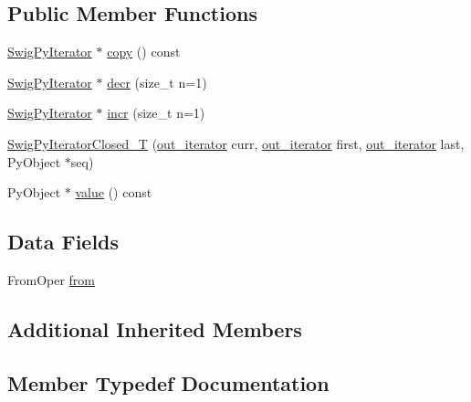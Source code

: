 \subsection*{Public Member Functions}
\begin{DoxyCompactItemize}
\item 
\hyperlink{structswig_1_1_swig_py_iterator}{Swig\+Py\+Iterator} $\ast$ \hyperlink{classswig_1_1_swig_py_iterator_closed___t_afa43a5af55b0f4ddee56308cb6c72eba}{copy} () const
\item 
\hyperlink{structswig_1_1_swig_py_iterator}{Swig\+Py\+Iterator} $\ast$ \hyperlink{classswig_1_1_swig_py_iterator_closed___t_aafae78acb63a1c4acaf2a76d4e9f6267}{decr} (size\+\_\+t n=1)
\item 
\hyperlink{structswig_1_1_swig_py_iterator}{Swig\+Py\+Iterator} $\ast$ \hyperlink{classswig_1_1_swig_py_iterator_closed___t_a1bf667d0f643064b452ecb2fc5e48df2}{incr} (size\+\_\+t n=1)
\item 
\hyperlink{classswig_1_1_swig_py_iterator_closed___t_ae23b1da812fe9a789dcbc18b4db5ffe9}{Swig\+Py\+Iterator\+Closed\+\_\+T} (\hyperlink{classswig_1_1_swig_py_iterator___t_aec35545038c3d804975a147253f061e4}{out\+\_\+iterator} curr, \hyperlink{classswig_1_1_swig_py_iterator___t_aec35545038c3d804975a147253f061e4}{out\+\_\+iterator} first, \hyperlink{classswig_1_1_swig_py_iterator___t_aec35545038c3d804975a147253f061e4}{out\+\_\+iterator} last, Py\+Object $\ast$seq)
\item 
Py\+Object $\ast$ \hyperlink{classswig_1_1_swig_py_iterator_closed___t_a4baeeb91419a21260b89205f325e0566}{value} () const
\end{DoxyCompactItemize}
\subsection*{Data Fields}
\begin{DoxyCompactItemize}
\item 
From\+Oper \hyperlink{classswig_1_1_swig_py_iterator_closed___t_a8a87b95d1e7e7d0784866dc71189575d}{from}
\end{DoxyCompactItemize}
\subsection*{Additional Inherited Members}


\subsection{Member Typedef Documentation}
\mbox{\label{classswig_1_1_swig_py_iterator_closed___t_a7a4e72c91ddb0aa9a92484d20c260ee8}} 
